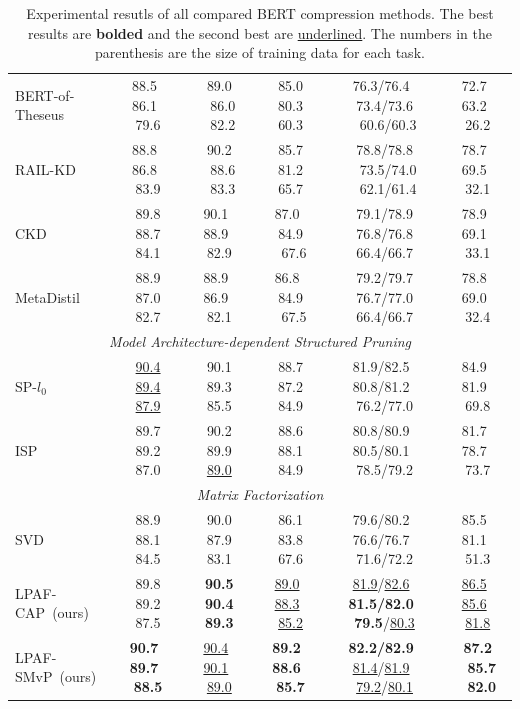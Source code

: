 \begin{table}[thb!]
\begin{tabular}{lccccc}
			BERT-of-Theseus & 88.5~ 86.1~ 79.6          & 89.0 ~86.0 ~82.2          & 85.0 ~80.3~ 60.3          & 76.3/76.4~ 73.4/73.6 ~60.6/60.3         &72.7~ 63.2~ 26.2                                                      \\
			RAIL-KD        & 88.8~ 86.8~ 83.9          &90.2 ~88.6 ~83.3          &85.7 ~81.2~ 65.7          &78.8/78.8 ~73.5/74.0 ~62.1/61.4         &78.7~ 69.5~ 32.1                                                      \\
			CKD        & 89.8 ~88.7~ 84.1          & 90.1~ 88.9~ 82.9          & 87.0~ 84.9 ~67.6          & 79.1/78.9 ~76.8/76.8~ 66.4/66.7          &78.9~ 69.1~ 33.1                                                      \\
			MetaDistil         & 88.9 ~87.0~ 82.7          & 88.9~ 86.9~ 82.1          & 86.8~ 84.9 ~67.5          & 79.2/79.7 ~76.7/77.0~ 66.4/66.7          &78.8~ 69.0~ 32.4                                                      \\
			\midrule
			 \multicolumn{6}{c}{\textit{Model Architecture-dependent Structured Pruning}}   \\
			\midrule
			SP-$l_0$        & \underline{90.4} ~\underline{89.4}~ \underline{87.9}         & 90.1 ~89.3~ 85.5          & 88.7 ~87.2~ 84.9          & 81.9/82.5~ 80.8/81.2~ 76.2/77.0          &84.9~ 81.9~ 69.8          \\
			ISP        & 89.7 ~89.2~ 87.0         & 90.2 ~89.9~ \underline{89.0}          & 88.6 ~88.1~ 84.9          & 80.8/80.9~ 80.5/80.1~ 78.5/79.2          & 81.7~ 78.7~ 73.7          \\
			\midrule
		   \multicolumn{6}{c}{\textit{Matrix Factorization}}   \\
			\midrule
			SVD        & 88.9 ~88.1~ 84.5         & 90.0 ~87.9~ 83.1          & 86.1 ~83.8~ 67.6          & 79.6/80.2~ 76.6/76.7~ 71.6/72.2         & 85.5~ 81.1~ 51.3          \\
			LPAF-CAP~(ours)       &89.8 ~89.2~ 87.5 &\textbf{90.5} ~\textbf{90.4}~ \textbf{89.3}    &\underline{89.0}~ \underline{88.3}~ \underline{85.2}  &\underline{81.9}/\underline{82.6}~ \textbf{81.5/82.0}~ \textbf{79.5}/\underline{80.3}    &\underline{86.5}~ \underline{85.6}~ \underline{81.8}    \\
			LPAF-SMvP~(ours)       & \textbf{90.7~ 89.7~ 88.5} & \underline{90.4}~ \underline{90.1}~ \underline{89.0} & \textbf{89.2~ 88.6~ 85.7} & \textbf{82.2/82.9}~ \underline{81.4}/\underline{81.9}~ \underline{79.2}/\underline{80.1}& \textbf{87.2 ~85.7 ~82.0} \\
			\bottomrule
		\end{tabular}
		\caption{Experimental resutls of all compared BERT compression methods. The best results are \textbf{bolded} and the second best are \underline{underlined}. The numbers in the parenthesis are the size of training data for each task.}
		\label{table:all}
	\end{table}
	
